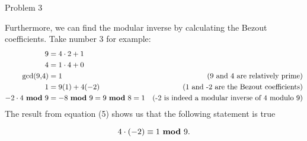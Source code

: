 \begin{problem}{Problem 3}
\begin{highlight}[Synopsis]
        Furthermore, we can find the modular inverse by calculating the Bezout coefficients. Take number 3 for example:
        \begin{align}
            9 & = 4 \cdot 2 + 1 & \\
            4 & = 1 \cdot 4 + 0 & \\
            \text{gcd(9,4)} & = 1 & \text{(9 and 4 are relatively prime)} \\
            1 & = 9(1) + 4(-2) & \text{(1 and -2 are the Bezout coefficients)} \\
            -2 \cdot 4 \text{ \textbf{mod} } 9 & = -8 \text{ \textbf{mod} } 9 = 9 \text{ \textbf{mod} } 8 = 1 & \text{(-2 is indeed a modular inverse of 4 modulo 9)}
        \end{align}
        The result from equation (5) shows us that the following statement is true

        \begin{equation*}
            4 \cdot (-2) \equiv 1 \text{ \textbf{mod} } 9.
        \end{equation*}
    \end{highlight}
\end{problem}

